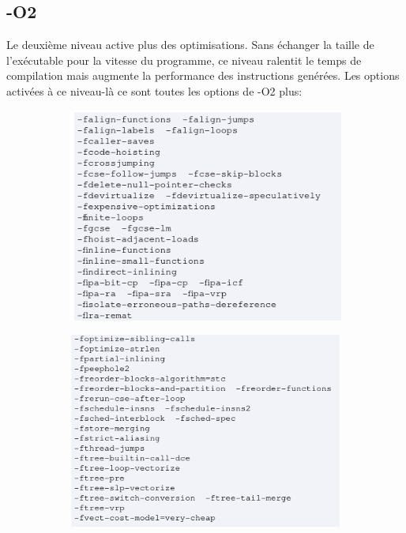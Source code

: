 \documentclass[11pt]{article} %
\begin{document}
\subsection*{-O2}

Le deuxième niveau active plus des optimisations. Sans échanger la taille de l'exécutable
pour la vitesse du programme, ce niveau ralentit le temps de compilation mais augmente la performance
des instructions genérées. Les options activées à ce niveau-là ce sont toutes les options de -O2 plus:

\begin{figure}[h!]
    \centering
    \begin{subfigure}[h!]{0.49\textwidth}
        \includegraphics[height=.8\linewidth]{./media/O2top}
    \end{subfigure}
    \begin{subfigure}[h!]{0.49\textwidth}
        \includegraphics[height=.8\linewidth]{./media/O2bot}
    \end{subfigure}
\end{figure}
\end{document}
